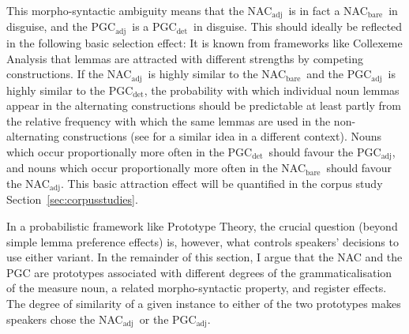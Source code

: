 \documentclass[USenglish]{article}
\newcommand{\Sub}[1]{\ensuremath{\mathrm{_{#1}}}}
\newcommand{\NACb}{NAC\Sub{bare}}
\newcommand{\NACa}{NAC\Sub{adj}}
\newcommand{\PGCd}{PGC\Sub{det}}
\newcommand{\PGCa}{PGC\Sub{adj}}
\begin{document}
This morpho-syntactic ambiguity means that the \NACa\ is in fact a \NACb\ in disguise, and the \PGCa\ is a \PGCd\ in disguise.
This should ideally be reflected in the following basic selection effect:
It is known from frameworks like Collexeme Analysis \citep{GriesStefanowitsch2004} that lemmas are attracted with different strengths by competing constructions.
If the \NACa\ is highly similar to the \NACb\ and the \PGCa\ is highly similar to the \PGCd, the probability with which individual noun lemmas appear in the alternating constructions should be predictable at least partly from the relative frequency with which the same lemmas are used in the non-alternating constructions (see \citealp[246--249]{Levshina2016} for a similar idea in a different context).
Nouns which occur proportionally more often in the \PGCd\ should favour the \PGCa, and nouns which occur proportionally more often in the \NACb\ should favour the \NACa.
This basic attraction effect will be quantified in the corpus study Section~\ref{sec:corpusstudies}.


In a probabilistic framework like Prototype Theory, the crucial question (beyond simple lemma preference effects) is, however, what controls speakers' decisions to use either variant. 
In the remainder of this section, I argue that the NAC and the PGC are prototypes associated with different degrees of the grammaticalisation of the measure noun, a related morpho-syntactic property, and register effects.
The degree of similarity of a given instance to either of the two prototypes makes speakers chose the \NACa\ or the \PGCa.
\end{document}

